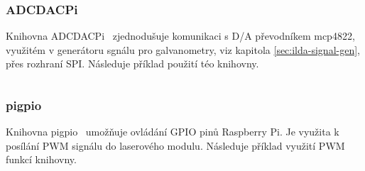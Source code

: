 \subsubsection{ADCDACPi}
Knihovna ADCDACPi~\cite{ADCDACPi} zjednodušuje komunikaci s D/A převodníkem mcp4822, využitém v generátoru sgnálu pro galvanometry, viz kapitola \ref{sec:ilda-signal-gen}, přes rozhraní SPI. Následuje příklad použití téo knihovny.

\inputminted[frame=lines,fontsize=\footnotesize{}, linenos, breaklines]{cpp}{code_examples/adcdac.cpp}

\subsubsection{pigpio}\label{sec:ls_pigpio}
Knihovna pigpio~\cite{pigpio} umožňuje ovládání GPIO pinů Raspberry Pi. Je využita k posílání PWM signálu do laserového modulu. Následuje příklad využití PWM funkcí knihovny.

\inputminted[frame=lines,fontsize=\footnotesize{}, linenos, breaklines]{cpp}{code_examples/pigpio_pwm.cpp}

